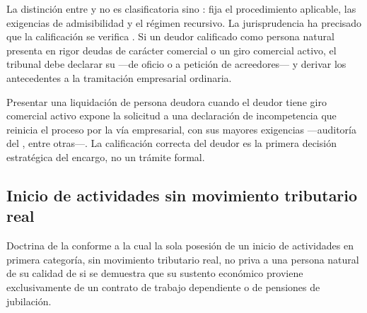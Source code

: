 La distinción entre \empresadeudora{} y \personadeudora{} no es clasificatoria sino
: fija el procedimiento aplicable, las exigencias de admisibilidad
y el régimen recursivo. La jurisprudencia ha precisado que la calificación se verifica
. Si un deudor calificado como persona
natural presenta en rigor deudas de carácter comercial o un giro comercial activo, el tribunal debe
declarar su  ---de oficio o a petición de acreedores--- y derivar los
antecedentes a la tramitación empresarial ordinaria.

\begin{alerta}
Presentar una liquidación de persona deudora cuando el deudor tiene giro comercial activo expone la
solicitud a una declaración de incompetencia que reinicia el proceso por la vía empresarial, con
sus mayores exigencias ---auditoría del , entre otras---. La calificación correcta del
deudor es la primera decisión estratégica del encargo, no un trámite formal.
\end{alerta}

\subsection{Inicio de actividades sin movimiento tributario real}

Doctrina de la  conforme a la cual la sola posesión de un inicio de
actividades en primera categoría, sin movimiento tributario real, no priva a una persona
natural de su calidad de \personadeudora{} si se demuestra que su sustento económico
proviene exclusivamente de un contrato de trabajo dependiente o de pensiones de
jubilación.
